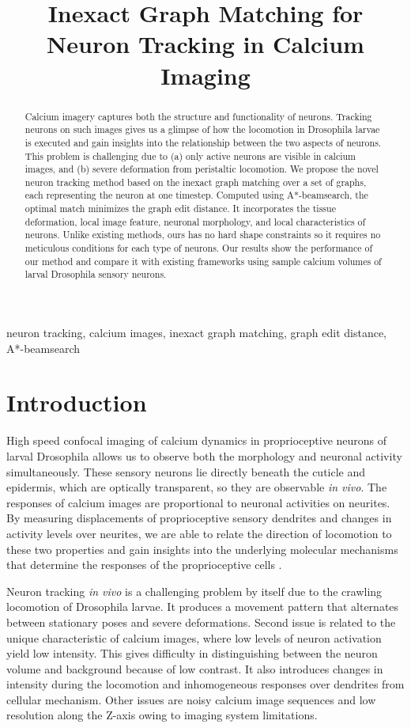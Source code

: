 \documentclass{article}
\title{Inexact Graph Matching for Neuron Tracking in Calcium Imaging}
\begin{document}
%
\maketitle
%
\begin{abstract}	
Calcium imagery captures both the structure and functionality of neurons. Tracking neurons on such images gives us a glimpse of how the locomotion in Drosophila larvae is executed and gain insights into the relationship between the two aspects of neurons. This problem is challenging due to (a) only active neurons are visible in calcium images, and (b) severe deformation from peristaltic locomotion. We propose the novel neuron tracking method based on the inexact graph matching over a set of graphs, each representing the neuron at one timestep. Computed using A*-beamsearch, the optimal match minimizes the graph edit distance. It incorporates the tissue deformation, local image feature, neuronal morphology, and local characteristics of neurons. Unlike existing methods, ours has no hard shape constraints so it requires no meticulous conditions for each type of neurons. Our results show the performance of our method and compare it with existing frameworks using sample calcium volumes of larval Drosophila sensory neurons.

\end{abstract}
%
\begin{keywords}
neuron tracking, calcium images, inexact graph matching, graph edit distance, A*-beamsearch
\end{keywords}
%
\section{Introduction}
\label{sec:intro}

High speed confocal imaging of calcium dynamics in proprioceptive neurons of larval Drosophila allows us to observe both the morphology and neuronal activity simultaneously. These sensory neurons lie directly beneath the cuticle and epidermis, which are optically transparent, so they are observable \emph{in vivo}. The responses of calcium images are proportional to neuronal activities on neurites. By measuring displacements of proprioceptive sensory dendrites and changes in activity levels over neurites, we are able to relate the direction of locomotion to these two properties and gain insights into the underlying molecular mechanisms that determine the responses of the proprioceptive cells \cite{He2019}.

Neuron tracking \emph{in vivo} is a challenging problem by itself due to the crawling locomotion of Drosophila larvae. It produces a movement pattern that alternates between stationary poses and severe deformations. Second issue is related to the unique characteristic of calcium images, where low levels of neuron activation yield low intensity. This gives difficulty in distinguishing between the neuron volume and background because of low contrast. It also introduces changes in intensity during the locomotion and inhomogeneous responses over dendrites from cellular mechanism. Other issues are noisy calcium image sequences and low resolution along the Z-axis owing to imaging system limitations.
\end{document}
